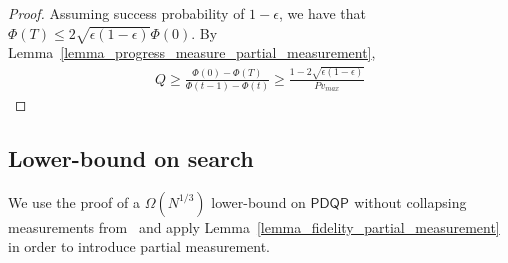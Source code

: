 \documentclass[10pt,a4paper]{article}
\newcommand{\compclass}[2][]{\ensuremath{\mathsf{#2}^{#1}}\xspace}
\newcommand{\pdqpname}[0]{\compclass{PDQP}}
\begin{document}
    \begin{proof}
        Assuming success probability of $1-\epsilon$, we have that $\Phi(T) \leq 2\sqrt{\epsilon (1-\epsilon)} \Phi(0)$. By Lemma~\ref{lemma_progress_measure_partial_measurement},
        \begin{align*}
            Q\geq \frac{\Phi(0)-\Phi(T)}{\Phi(t-1)-\Phi(t)} \geq \frac{1-2\sqrt{\epsilon(1-\epsilon)}}{P v_{max}}
        \end{align*}
\end{proof}

\subsection{Lower-bound on search}

We use the proof of a $\Omega(N^{1/3})$ lower-bound on \pdqpname without collapsing measurements from~\cite{space_above_bqp} and apply Lemma~\ref{lemma_fidelity_partial_measurement} in order to introduce partial measurement.
\end{document}
